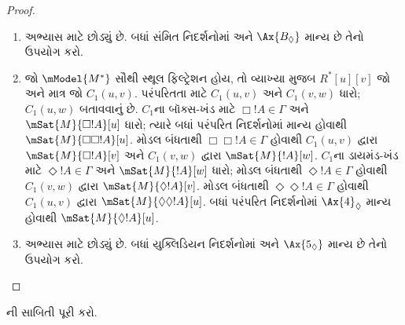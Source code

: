 \begin{proof}
\begin{enumerate}
  \item અભ્યાસ માટે છોડ્યું છે. બધાં સંમિત નિદર્શનોમાં
     અને $\Ax{B_\Diamond}$ માન્ય છે તેનો ઉપયોગ કરો.
  \item જો $\mModel{M^*}$ સૌથી સ્થૂલ ફિલ્ટ્રેશન હોય, તો વ્યાખ્યા
    મુજબ $R^*[u][v]$ જો અને માત્ર જો $C_1(u,v)$. પરંપરિતતા
    માટે $C_1(u,v)$ અને $C_1(v,w)$ ધારો; $C_1(u,w)$ બતાવવાનું છે.
    $C_1$ના બૉક્સ-ખંડ માટે $\Box !A \in \Gamma$
      અને $\mSat{M}{\Box !A}[u]$ ધારો; ત્યારે
      બધાં પરંપરિત નિદર્શનોમાં  માન્ય હોવાથી
      $\mSat{M}{\Box\Box!A}[u]$. મોડલ બંધતાથી
      $\Box\Box!A \in \Gamma$ હોવાથી $C_1(u,v)$ દ્વારા
      $\mSat{M}{\Box!A}[v]$ અને $C_1(v,w)$ દ્વારા
      $\mSat{M}{!A}[w]$. %
    $C_1$ના ડાયમંડ-ખંડ માટે
      $\Diamond !A \in \Gamma$ અને $\mSat{M}{!A}[w]$ ધારો; મોડલ
      બંધતાથી $\Diamond !A \in \Gamma$ હોવાથી $C_1(v,w)$
      દ્વારા $\mSat{M}{\Diamond !A}[v]$. મોડલ બંધતાથી
      $\Diamond\Diamond!A \in \Gamma$ હોવાથી $C_1(u,v)$
      દ્વારા $\mSat{M}{\Diamond\Diamond !A}[u]$. બધાં
      પરંપરિત નિદર્શનોમાં $\Ax{4}_\Diamond$ માન્ય હોવાથી
      $\mSat{M}{\Diamond!A}[u]$.
  \item અભ્યાસ માટે છોડ્યું છે. બધાં યુક્લિડિયન નિદર્શનોમાં
     અને $\Ax{5_\Diamond}$ માન્ય છે તેનો ઉપયોગ કરો.
\end{enumerate}
\end{proof}


\begin{prob}
  ની સાબિતી પૂરી કરો.
\end{prob}
\endgroup


\OLEndChapterHook
\endgroup


\begingroup
\makeatletter{}\makeatother

\label{guunit:OLP-0460}


